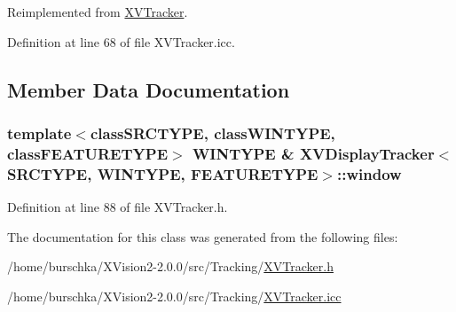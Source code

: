 Reimplemented from \hyperlink{class_XVTracker}{XVTracker}.

Definition at line 68 of file XVTracker.icc.

\subsection{Member Data Documentation}
\label{XVDisplayTracker_n0}
\hypertarget{class_XVDisplayTracker_n0}{
\subsubsection[window]{\setlength{\rightskip}{0pt plus 5cm}template$<$classSRCTYPE, classWINTYPE, classFEATURETYPE$>$ WINTYPE \& XVDisplay\-Tracker$<$SRCTYPE, WINTYPE, FEATURETYPE$>$::window}}




Definition at line 88 of file XVTracker.h.

The documentation for this class was generated from the following files:\begin{CompactItemize}
\item 
/home/burschka/XVision2-2.0.0/src/Tracking/\hyperlink{XVTracker.h-source}{XVTracker.h}\item 
/home/burschka/XVision2-2.0.0/src/Tracking/\hyperlink{XVTracker.icc-source}{XVTracker.icc}\end{CompactItemize}
